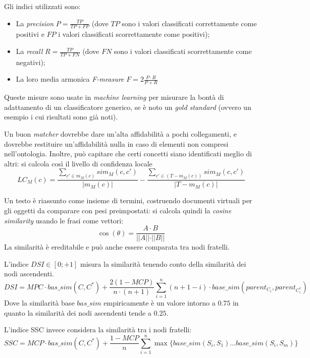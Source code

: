 \documentclass[11pt]{article}
\begin{document}
Gli indici utilizzati sono:
\begin{itemize}
\item La \textit{precision} $P = \frac{TP}{TP+FP}$ (dove $TP$ sono i valori classificati correttamente come positivi e $FP$ i valori classificati scorrettamente come positivi);
\item La \textit{recall} $R = \frac{TP}{TP+FN}$ (dove $FN$ sono i valori classificati scorrettamente come negativi);
\item La loro media armonica \textit{F-measure} $F =2 \frac{P \cdot R}{P+R}$
\end{itemize}
Queste misure sono usate in \textit{machine learning} per misurare la bontà di adattamento di un classificatore generico, se è noto un \textit{gold standard} (ovvero un esempio i cui risultati sono già noti).

Un buon \textit{matcher} dovrebbe dare un'alta affidabilità a pochi collegamenti, e dovrebbe restituire un'affidabilità nulla in caso di elementi non compresi nell'ontologia.
Inoltre, può capitare che certi concetti siano identificati meglio di altri: si calcola così il livello di confidenza locale
\begin{equation*}
  LC_M(c) = \frac{\sum_{c' \in m_M(c)}sim_M(c, c')}{|m_M(c)|} - \frac{\sum_{c' \in (T - m_M(c))}sim_M(c, c')}{|T - m_M(c)|}
\end{equation*}


Un testo è riassunto come insieme di termini, costruendo documenti virtuali per gli oggetti da comparare con pesi preimpostati: si calcola quindi la \textit{cosine similarity} usando le frasi come vettori:
\begin{equation*}
\cos(\theta) = \frac{A \cdot B}{\vert\vert A \vert\vert \cdot \vert\vert B \vert\vert}
\end{equation*}
La similarità è ereditabile e può anche essere comparata tra nodi fratelli.

L'indice $DSI \in [0; +1]$ misura la similarità tenendo conto della similarità dei nodi ascendenti.
\begin{equation*}
  DSI = MPC \cdot bas\_sim(C, C^*) + \frac{2(1 - MCP)}{n \cdot (n + 1)} \sum_{i=1}^n(n + 1 - i) \cdot base\_sim(parent_{C_i}, parent_{C^*_i})
\end{equation*}
Dove la similarità base $bas\_sim$ empiricamente è un valore intorno a $0.75$ in quanto la similarità dei nodi ascendenti tende a $0.25$. \newline

L'indice SSC invece considera la similarità tra i nodi fratelli:
\begin{equation*}
  SSC = MCP \cdot bas\_sim(C, C^*) + \frac{1-MCP}{n}\sum_{i=1}^n{\max\{base\_sim(S_i, S_1) ... base\_sim(S_i, S_m)\}}
\end{equation*}
\end{document}
